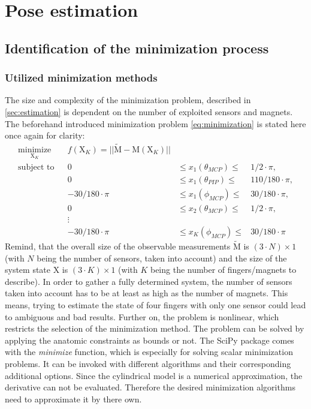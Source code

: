 \section{Pose estimation} \label{sec:estimationRes}

\subsection{Identification of the minimization process} \label{subsec:resSim}

\subsubsection{Utilized minimization methods} \label{subsubsec:miniMethod}

The size and complexity of the minimization problem, described in \ref{sec:estimation} is dependent on the number of exploited sensors and magnets. The beforehand introduced minimization problem \ref{eq:minimization} is stated here once again for clarity:
\begin{equation*} \label{eq:minimization}
\begin{aligned}
\underset{\mathrm{X}_K}{\text{minimize}} & & f(\mathrm{X}_K) = || \tilde{\mathrm{M}} - \mathrm{M}(\mathrm{X}_K) ||\\
\text{subject to} & & 0 & \leq {x}_1(\theta_{MCP}) \leq & 1/2 \cdot \pi, \\
				  & & 0 & \leq {x}_1(\theta_{PIP})  \leq & 110/180 \cdot \pi, \\
				  & & -30/180 \cdot \pi & \leq {x}_1(\phi_{MCP}) \leq & 30/180 \cdot \pi, \\
				  & & 0 & \leq {x}_2(\theta_{MCP})  \leq & 1/2 \cdot \pi, \\
				  & & \vdots \\
				  & & -30/180 \cdot \pi & \leq {x}_K(\phi_{MCP}) \leq & 30/180 \cdot \pi
\end{aligned}
\end{equation*}
Remind, that the overall size of the observable measurements $ \tilde{\mathrm{M}} $ is $ (3 \cdot N) \times 1 $ (with $ N $ being the number of sensors, taken into account) and the size of the system state X is $ (3 \cdot K) \times 1 $ (with $ K $ being the number of fingers/magnets to describe). In order to gather a fully determined system, the number of sensors taken into account has to be at least as high as the number of magnets. This means, trying to estimate the state of four fingers with only one sensor could lead to ambiguous and bad results. Further on, the problem is nonlinear, which restricts the selection of the minimization method. The problem can be solved by applying the anatomic constraints as bounds or not. The SciPy package comes with the \emph{minimize} function, which is especially for solving scalar minimization problems. It can be invoked with different algorithms and their corresponding additional options. Since the cylindrical model is a numerical approximation, the derivative can not be evaluated. Therefore the desired minimization algorithms need to approximate it by there own.

